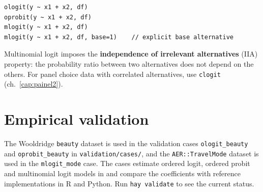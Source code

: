 \begin{lstlisting}
ologit(y ~ x1 + x2, df)
oprobit(y ~ x1 + x2, df)
mlogit(y ~ x1 + x2, df)
mlogit(y ~ x1 + x2, df, base=1)    // explicit base alternative
\end{lstlisting}

\begin{nota}
  Multinomial logit imposes the \textbf{independence of irrelevant alternatives}
  (IIA) property: the probability ratio between two alternatives does not depend
  on the others. For panel choice data with correlated alternatives, use
  \lstinline{clogit} (ch.~\ref{cap:painel2}).
\end{nota}

\section{Empirical validation}

The Wooldridge \texttt{beauty} dataset is used in the validation cases
\texttt{ologit\_beauty} and \texttt{oprobit\_beauty} in \texttt{validation/cases/},
and the \texttt{AER::TravelMode} dataset is used in the \texttt{mlogit\_mode} case.
The cases estimate ordered logit, ordered probit and multinomial logit models in
\hayashi{} and compare the coefficients with reference implementations in R and
Python. Run \lstinline{hay validate} to see the current status.
